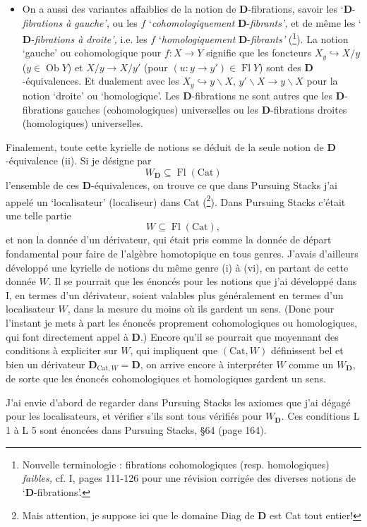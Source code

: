 \documentclass[11pt]{article}
\newcommand{\printedpage}[1]{\marginpar{\footnotesize p.~#1}}
\newcommand{\msp}[1]{\marginpar{\footnotesize [#1]}}
\newcommand{\D}{\mathbf{D}}
\newcommand{\Cat}{\mathrm{Cat}}
\newcommand{\Fl}{\operatorname{Fl}}
\newcommand{\Ob}{\operatorname{Ob}}
\begin{document}
\begin{itemize}
\item[(vi)] On a aussi des variantes affaiblies de la notion de $\D$-fibrations, savoir les ‘$\D$-\textit{fibrations à gauche’,} ou les $f$ ‘\textit{cohomologiquement} $\D$-\textit{fibrants’,} et de même les ‘$\D$-\textit{fibrations à droite’,} i.e. les $f$ ‘\textit{homologiquement} $\D$-\textit{fibrants’} (\footnote{Nouvelle terminologie : fibrations cohomologiques (resp. homologiques) \textit{faibles,} cf. I, pages 111-126 pour une révision corrigée des diverses notions de ‘$\D$-fibrations’.}). La notion ‘gauche’
\printedpage{2}
ou cohomologique pour $f : X \longrightarrow Y$ signifie que les foncteurs $X_y \hookrightarrow X/y$ ($y \in \Ob Y$) et $X/y \longrightarrow X/y'$ (pour $(u : y \longrightarrow y') \in \Fl Y$) sont des $\D$-équivalences. Et dualement avec les $X_y \hookrightarrow y\backslash X$, $y'\backslash X \longrightarrow y\backslash X$ pour la notion ‘droite’ ou ‘homologique’. Les $\D$-fibrations ne sont autres que les $\D$-fibrations gauches (cohomologiques) universelles ou les $\D$-fibrations droites (homologiques) universelles.
\end{itemize}

Finalement, toute cette kyrielle de notions se déduit de la seule notion de $\D$-équivalence (ii). Si je désigne par
\[
W_{\D} \subseteq \Fl(\Cat)
\]
l’ensemble de ces $\D$-équivalences, on trouve ce que dans Pursuing Stacks j’ai appelé un ‘localisateur’ (localiseur) dans Cat (\footnote{Mais attention, je suppose ici que le domaine Diag de $\D$ est Cat tout entier!}). Dans Pursuing Stacks c’était une telle partie
\[
W \subseteq \Fl(\Cat),
\]
et non la donnée d’un dérivateur, qui
\msp{page 3}
était pris comme la donnée de départ fondamental pour faire de l’algèbre homotopique en tous genres. J’avais d’ailleurs développé une kyrielle de notions du même genre (i) à (vi), en partant de cette donnée $W$. Il se pourrait que les énoncés pour les notions que j’ai développé dans I, en termes d’un dérivateur, soient valables plus généralement en termes d’un localisateur $W$, dans la mesure du moins où ils gardent un sens. (Donc pour l’instant je mets à part les énoncés proprement cohomologiques ou homologiques, qui font directement appel à $\D$.) Encore qu’il se pourrait que moyennant des conditions à expliciter sur $W$, qui impliquent que $(\Cat, W)$ définissent bel et bien un dérivateur $\D_{\Cat,W} = \D$, on arrive encore à interpréter $W$ comme un $W_{\D}$, de sorte que les énoncés cohomologiques et homologiques gardent un sens.

J’ai envie d’abord de regarder dans Pursuing Stacks les axiomes que j’ai dégagé pour les localisateurs, et vérifier s’ils sont tous vérifiés pour
\msp{page 4}
$W_{\D}$. Ces conditions L 1 à L 5 sont énoncées dans Pursuing Stacks, §64 (page 164).
\end{document}
